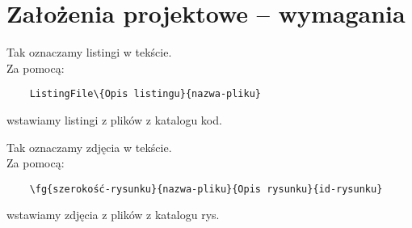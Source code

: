 	\newpage
\section{Założenia projektowe – wymagania}		%



Tak oznaczamy listingi  w tekście.\\Za pomocą:

  \begin{verbatim}
	ListingFile\{Opis listingu}{nazwa-pliku} 
 \end{verbatim}
	
	wstawiamy listingi z plików z katalogu kod.



\clearpage


Tak oznaczamy zdjęcia  w tekście.\\Za pomocą:

  \begin{verbatim}
	\fg{szerokość-rysunku}{nazwa-pliku}{Opis rysunku}{id-rysunku} 
 \end{verbatim}
	
	wstawiamy zdjęcia z plików z katalogu rys.



